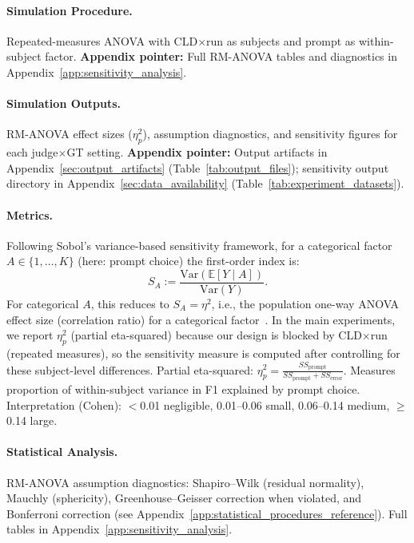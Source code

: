 \paragraph{Simulation Procedure.}
Repeated-measures ANOVA with CLD$\times$run as subjects and prompt as within-subject factor.
\textbf{Appendix pointer:} Full RM-ANOVA tables and diagnostics in Appendix~\ref{app:sensitivity_analysis}.

\paragraph{Simulation Outputs.}
RM-ANOVA effect sizes ($\eta^2_p$), assumption diagnostics, and sensitivity figures for each judge$\times$GT setting.
\textbf{Appendix pointer:} Output artifacts in Appendix~\ref{sec:output_artifacts} (Table~\ref{tab:output_files}); sensitivity output directory in Appendix~\ref{sec:data_availability} (Table~\ref{tab:experiment_datasets}).

\paragraph{Metrics.}
Following Sobol's variance-based sensitivity framework, for a categorical factor $A\in\{1,\dots,K\}$ (here: prompt choice) the first-order index is:
\begin{equation}
S_A := \frac{\mathrm{Var}(\mathbb{E}[Y \mid A])}{\mathrm{Var}(Y)}.
\end{equation}
For categorical $A$, this reduces to $S_A=\eta^2$,
i.e., the population one-way ANOVA effect size (correlation ratio) for a categorical factor~\cite{saltelli2010variance}. In the main
experiments, we report $\eta^2_p$ (partial eta-squared) because our design is blocked by CLD$\times$run (repeated
measures), so the sensitivity measure is computed after controlling for these subject-level differences.
Partial eta-squared: $\eta^2_p = \frac{SS_{\text{prompt}}}{SS_{\text{prompt}} + SS_{\text{error}}}$. Measures proportion of within-subject variance in F1 explained by prompt choice. Interpretation (Cohen): $<$0.01 negligible, 0.01--0.06 small, 0.06--0.14 medium, $\geq$0.14 large.

\paragraph{Statistical Analysis.}
RM-ANOVA assumption diagnostics: Shapiro--Wilk (residual normality), Mauchly (sphericity), Greenhouse--Geisser correction when violated, and Bonferroni correction (see Appendix~\ref{app:statistical_procedures_reference}). Full tables in Appendix~\ref{app:sensitivity_analysis}.

